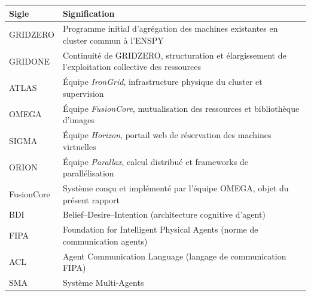 \documentclass[
    language=french,
    school=estg,
    docstage=final,
    media=paper,
    bookprint=false,
    linkcolor=red!45!black,
    chapterstyle=classic,
    coverstyle=classic,
    aiacknowledgement=false,
    listprefix=false
]{IPLeiriaThesis}
\theoremstyle{definition}
\theoremstyle{plain}
\begin{document}
\begin{longtable}{lp{11cm}}
\toprule
\textbf{Sigle} & \textbf{Signification} \\
\midrule
\endhead
GRIDZERO    & Programme initial d'agrégation des machines existantes en cluster commun à l'ENSPY \\
GRIDONE     & Continuité de GRIDZERO, structuration et élargissement de l'exploitation collective des ressources \\
ATLAS       & Équipe \emph{IronGrid}, infrastructure physique du cluster et supervision \\
OMEGA       & Équipe \emph{FusionCore}, mutualisation des ressources et bibliothèque d'images \\
SIGMA       & Équipe \emph{Horizon}, portail web de réservation des machines virtuelles \\
ORION       & Équipe \emph{Parallax}, calcul distribué et frameworks de parallélisation \\
FusionCore  & Système conçu et implémenté par l'équipe OMEGA, objet du présent rapport \\
BDI         & Belief--Desire--Intention (architecture cognitive d'agent) \\
FIPA        & Foundation for Intelligent Physical Agents (norme de communication agents) \\
ACL         & Agent Communication Language (langage de communication FIPA) \\
SMA         & Système Multi-Agents \\
\bottomrule
\end{longtable}

\acronymtoc\printacronymglossary

\symboltoc\printsymbolglossary











\printbibliography[title={Bibliographie},heading=bibintoc]


\appendix




\end{document}
